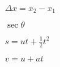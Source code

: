 \documentclass[]{article}
\begin{document}
$\Delta x = x_2 - x_1$

$ \sec \theta  $


$s = ut + \frac{1}{2}t^2 $


$v= u + at$
\end{document}
